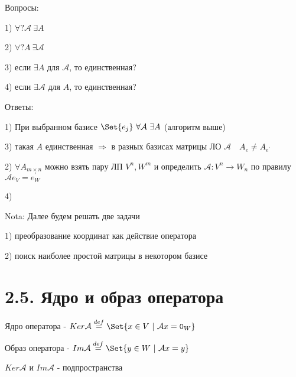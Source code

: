 \documentclass[12pt]{article}
\begin{document}
    Вопросы:

    1) $\forall ? \mathcal{A} \ \exists A$

    2) $\forall ? A \ \exists \mathcal{A}$

    3) если $\exists A$ для $\mathcal{A}$, то единственная?

    4) если $\exists \mathcal{A}$ для $A$, то единственная?

    Ответы:

    1) При выбранном базисе $\displaystyle \Set{e_j} \ \forall \mathcal{A} \ \exists A$ (алгоритм выше)

    3) такая $A$ единственная $\Longrightarrow$ в разных базисах матрицы ЛО $\displaystyle \mathcal{A} \quad A_e \neq A_{e^\prime}$

    2) $\displaystyle \forall A_{m\times n}$ можно взять пару ЛП $\displaystyle V^n, W^m$ и определить $\displaystyle \mathcal{A} : V^n \rightarrow W_n$ по правилу $\displaystyle \mathcal{A}e_V = e_W^\prime$

    4) \Lab

    Nota: Далее будем решать две задачи

    1) преобразование координат как действие оператора

    2) поиск наиболее простой матрицы в некотором базисе

    \section[p2\_5]{2.5. Ядро и образ оператора}

    \Def Ядро оператора - $\displaystyle Ker \mathcal{A} \stackrel{def}{=} \Set{x \in V \ | \ \mathcal{A}x = \texttt{0}_W}$

    \Def Образ оператора - $Im \mathcal{A} \stackrel{def}{=} \Set{y \in W \ | \ \mathcal{A}x = y}$

    \Nota $Ker \mathcal{A}$ и $Im \mathcal{A}$ - подпространства
\end{document}
